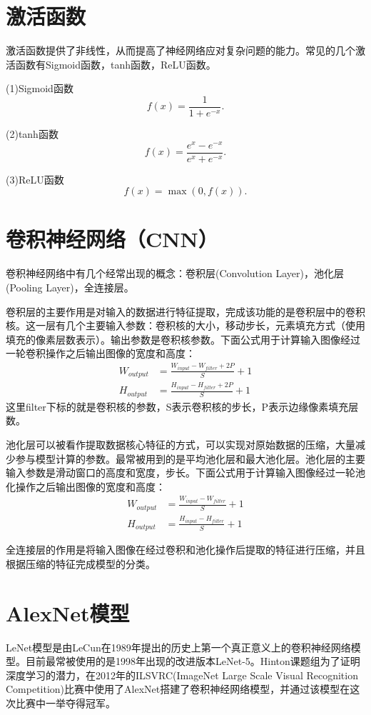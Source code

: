 \documentclass[12pt,a4paper,openany]{book}
\begin{document}
\section{激活函数}
激活函数提供了非线性，从而提高了神经网络应对复杂问题的能力。常见的几个激活函数有Sigmoid函数，tanh函数，ReLU函数。

(1)Sigmoid函数
\[
f(x) = \frac{1}{1 + e^{-x}}.
\]

(2)tanh函数
\[
f(x) = \frac{e^x - e^{-x}}{e^x + e^{-x}}.
\]

(3)ReLU函数
\[
f(x) = \max(0, f(x)).
\]

\section{卷积神经网络（CNN）}
卷积神经网络中有几个经常出现的概念：卷积层(Convolution Layer)，池化层(Pooling Layer)，全连接层。

卷积层的主要作用是对输入的数据进行特征提取，完成该功能的是卷积层中的卷积核。这一层有几个主要输入参数：卷积核的大小，移动步长，元素填充方式（使用填充的像素层数表示）。输出参数是卷积核参数。下面公式用于计算输入图像经过一轮卷积操作之后输出图像的宽度和高度：
\[
\begin{aligned}
W_{output} &= \frac{W_{input} - W_{filter} + 2P}{S} + 1 \\
H_{output} &= \frac{H_{input} - H_{filter} + 2P}{S} + 1
\end{aligned}
\]
这里filter下标的就是卷积核的参数，S表示卷积核的步长，P表示边缘像素填充层数。

池化层可以被看作提取数据核心特征的方式，可以实现对原始数据的压缩，大量减少参与模型计算的参数。最常被用到的是平均池化层和最大池化层。池化层的主要输入参数是滑动窗口的高度和宽度，步长。下面公式用于计算输入图像经过一轮池化操作之后输出图像的宽度和高度：
\[
\begin{aligned}
W_{output} &= \frac{W_{input} - W_{filter}}{S} + 1 \\
H_{output} &= \frac{H_{input} - H_{filter}}{S} + 1
\end{aligned}
\]

全连接层的作用是将输入图像在经过卷积和池化操作后提取的特征进行压缩，并且根据压缩的特征完成模型的分类。

\section{AlexNet模型}
LeNet模型是由LeCun在1989年提出的历史上第一个真正意义上的卷积神经网络模型。目前最常被使用的是1998年出现的改进版本LeNet-5。Hinton课题组为了证明深度学习的潜力，在2012年的ILSVRC(ImageNet Large Scale Visual Recognition Competition)比赛中使用了AlexNet搭建了卷积神经网络模型，并通过该模型在这次比赛中一举夺得冠军。
\end{document}
